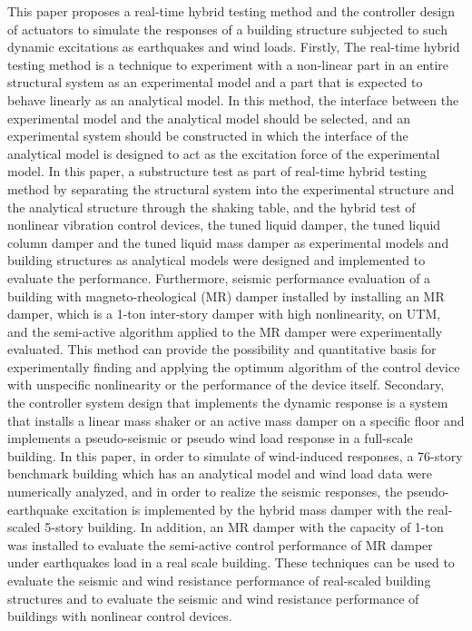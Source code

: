 This paper proposes a real-time hybrid testing method and the controller design of actuators to simulate the responses of a building structure subjected to such dynamic excitations as earthquakes and wind loads. Firstly, The real-time hybrid testing method is a technique to experiment with a non-linear part in an entire structural system as an experimental model and a part that is expected to behave linearly as an analytical model. In this method, the interface between the experimental model and the analytical model should be selected, and an experimental system should be constructed in which the interface of the analytical model is designed to act as the excitation force of the experimental model. In this paper, a substructure test as part of real-time hybrid testing method by separating the structural system into the experimental structure and the analytical structure through the shaking table, and the hybrid test of nonlinear vibration control devices, the tuned liquid damper, the tuned liquid column damper and the tuned liquid mass damper as experimental models and building structures as analytical models were designed and implemented to evaluate the performance. Furthermore, seismic performance evaluation of a building with magneto-rheological (MR) damper installed by installing an MR damper, which is a 1-ton inter-story damper with high nonlinearity, on UTM, and the semi-active algorithm applied to the MR damper were experimentally evaluated. This method can provide the possibility and quantitative basis for experimentally finding and applying the optimum algorithm of the control device with unspecific nonlinearity or the performance of the device itself. Secondary, the controller system design that implements the dynamic response is a system that installs a linear mass shaker or an active mass damper on a specific floor and implements a pseudo-seismic or pseudo wind load response in a full-scale building. In this paper, in order to simulate of wind-induced responses, a 76-story benchmark building which has an analytical model and wind load data were numerically analyzed, and in order to realize the seismic responses, the pseudo-earthquake excitation is implemented by the hybrid mass damper with the real-scaled 5-story building. In addition, an MR damper with the capacity of 1-ton was installed to evaluate the semi-active control performance of MR damper under earthquakes load in a real scale building. These techniques can be used to evaluate the seismic and wind resistance performance of real-scaled building structures and to evaluate the seismic and wind resistance performance of buildings with nonlinear control devices.

